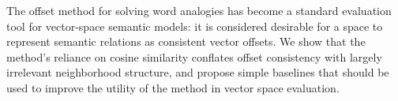 The offset method for solving word analogies has become a standard evaluation tool for vector-space semantic models: it is considered desirable for a space to represent semantic relations as consistent vector offsets. We show that the method's reliance on cosine similarity conflates offset consistency with largely irrelevant neighborhood structure, and propose simple baselines that should be used to improve the utility of the method in vector space evaluation.
